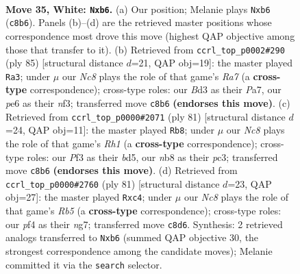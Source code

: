 \documentclass[11pt]{article}
\begin{document}
\clearpage

\begin{figure}[p]\centering
\begin{subfigure}{0.46\textwidth}\centering
\resizebox{\linewidth}{!}{%
\newchessgame
\chessboard[
  setfen={1nN5/6k1/1p2p3/6p1/5p2/3B1P2/2P3K1/3r4 w - - 0 35},
  showmover=false,
  pgfstyle=straightmove, color=movearrow, markmove={c8-b6}
]}
\caption{}
\end{subfigure}\hfill
\begin{subfigure}{0.46\textwidth}\centering
\resizebox{\linewidth}{!}{%
\newchessgame
\chessboard[
  setfen={R7/p4pk1/4p3/1P4P1/P7/5N1K/rb6/8 b - - 6 43},
  showmover=false,
  pgfstyle=straightmove, color=movearrow, markmove={a2-a3}
]}
\caption{}
\end{subfigure}
\\[4pt]
\begin{subfigure}{0.46\textwidth}\centering
\resizebox{\linewidth}{!}{%
\newchessgame
\chessboard[
  setfen={7r/8/3p4/KP1B1p1p/8/2P3kP/4Rb2/8 b - - 0 41},
  showmover=false,
  pgfstyle=straightmove, color=movearrow, markmove={h8-b8}
]}
\caption{}
\end{subfigure}\hfill
\begin{subfigure}{0.46\textwidth}\centering
\resizebox{\linewidth}{!}{%
\newchessgame
\chessboard[
  setfen={8/1p2k1N1/5p2/R1b5/1rP3P1/7P/6K1/8 b - - 0 41},
  showmover=false,
  pgfstyle=straightmove, color=movearrow, markmove={b4-c4}
]}
\caption{}
\end{subfigure}
\caption{\textbf{Move 35, White: \texttt{Nxb6}.} (a) Our position; Melanie plays \texttt{Nxb6} (\texttt{c8b6}). Panels (b)--(d) are the retrieved master positions whose correspondence most drove this move (highest QAP objective among those that transfer to it). (b) Retrieved from \texttt{ccrl\_top\_p0002\#290} (ply 85) [structural distance $d$=21, QAP obj=19]: the master played \texttt{Ra3}; under $\mu$ our \emph{Nc8} plays the role of that game's \emph{Ra7} (a \textbf{cross-type} correspondence); cross-type roles: our \emph{B}d3 as their \emph{P}a7, our \emph{p}e6 as their \emph{n}f3; transferred move \texttt{c8b6} \textbf{(endorses this move)}. (c) Retrieved from \texttt{ccrl\_top\_p0000\#2071} (ply 81) [structural distance $d$=24, QAP obj=11]: the master played \texttt{Rb8}; under $\mu$ our \emph{Nc8} plays the role of that game's \emph{Rh1} (a \textbf{cross-type} correspondence); cross-type roles: our \emph{P}f3 as their \emph{b}d5, our \emph{n}b8 as their \emph{p}c3; transferred move \texttt{c8b6} \textbf{(endorses this move)}. (d) Retrieved from \texttt{ccrl\_top\_p0000\#2760} (ply 81) [structural distance $d$=23, QAP obj=27]: the master played \texttt{Rxc4}; under $\mu$ our \emph{Nc8} plays the role of that game's \emph{Rb5} (a \textbf{cross-type} correspondence); cross-type roles: our \emph{p}f4 as their \emph{n}g7; transferred move \texttt{c8d6}. Synthesis: 2 retrieved analogs transferred to \texttt{Nxb6} (summed QAP objective 30, the strongest correspondence among the candidate moves); Melanie committed it via the \texttt{search} selector.}
\label{fig:thought-m68}
\end{figure}
\end{document}
